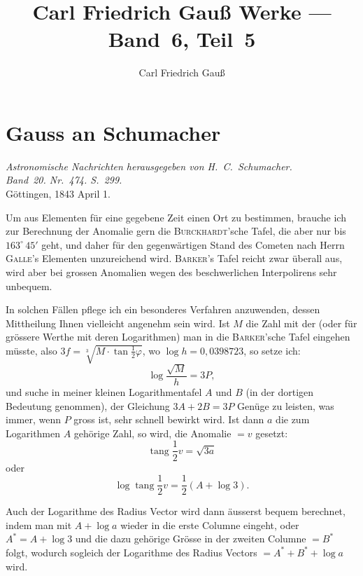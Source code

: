 \documentclass[11pt,a4paper]{book}
\title{Carl Friedrich Gauß Werke --- Band~6, Teil~5}
\author{Carl Friedrich Gauß}
\date{}
\newcommand{\tang}{\operatorname{tang}}
\begin{document}
\frontmatter
\maketitle
\thispagestyle{empty}

\mainmatter
\setcounter{page}{201}

\chapter*{Gauss an Schumacher}

\begin{center}
\textit{Astronomische Nachrichten herausgegeben von H.~C.~Schumacher.\\
Band~20. Nr.~474. S.~299.}\\[1em]
Göttingen, 1843 April 1.
\end{center}

Um aus Elementen für eine gegebene Zeit einen Ort zu bestimmen, brauche ich zur Berechnung der Anomalie gern die \textsc{Burckhardt}'sche Tafel, die aber nur bis $163^{\circ}\,45'$ geht, und daher für den gegenwärtigen Stand des Cometen nach Herrn \textsc{Galle}'s Elementen unzureichend wird. \textsc{Barker}'s Tafel reicht zwar überall aus, wird aber bei grossen Anomalien wegen des beschwerlichen Interpolirens sehr unbequem.

In solchen Fällen pflege ich ein besonderes Verfahren anzuwenden, dessen Mittheilung Ihnen vielleicht angenehm sein wird. Ist $M$ die Zahl mit der (oder für grössere Werthe mit deren Logarithmen) man in die \textsc{Barker}'sche Tafel eingehen müsste, also $3f = \sqrt[3]{M \cdot \tan \frac{1}{2} \varphi}$, wo $\log h = 0{,}0398723$, so setze ich:
\[
\log \frac{\sqrt{M}}{h} = 3P,
\]
und suche in meiner kleinen Logarithmentafel $A$ und $B$ (in der dortigen Bedeutung genommen), der Gleichung $3A + 2B = 3P$ Genüge zu leisten, was immer, wenn $P$ gross ist, sehr schnell bewirkt wird. Ist dann $a$ die zum Logarithmen $A$ gehörige Zahl, so wird, die Anomalie $= v$ gesetzt:
\[
\tang \frac{1}{2} v = \sqrt{3a}
\]
oder
\[
\log \tang \frac{1}{2} v = \frac{1}{2}(A + \log 3).
\]

Auch der Logarithme des Radius Vector wird dann äusserst bequem berechnet, indem man mit $A + \log a$ wieder in die erste Columne eingeht, oder $A^{*} = A + \log 3$ und die dazu gehörige Grösse in der zweiten Columne $= B^{*}$ folgt, wodurch sogleich der Logarithme des Radius Vectors $= A^{*} + B^{*} + \log a$ wird.
\end{document}
